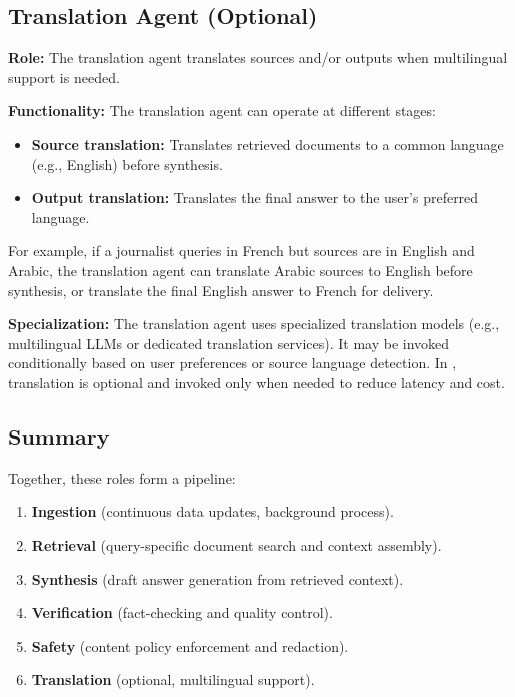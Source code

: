 \subsection{Translation Agent (Optional)}
\textbf{Role:} The translation agent translates sources and/or outputs when multilingual support is needed.  

\textbf{Functionality:} The translation agent can operate at different stages:  
\begin{itemize}
    \item \textbf{Source translation:} Translates retrieved documents to a common language (e.g., English) before synthesis.  
    \item \textbf{Output translation:} Translates the final answer to the user's preferred language.  
\end{itemize}  

For example, if a journalist queries in French but sources are in English and Arabic, the translation agent can translate Arabic sources to English before synthesis, or translate the final English answer to French for delivery.  

\textbf{Specialization:} The translation agent uses specialized translation models (e.g., multilingual LLMs or dedicated translation services). It may be invoked conditionally based on user preferences or source language detection. In \ishtar{}, translation is optional and invoked only when needed to reduce latency and cost.  

\subsection*{Summary}
Together, these roles form a pipeline:  
\begin{enumerate}
    \item \textbf{Ingestion} (continuous data updates, background process).  
    \item \textbf{Retrieval} (query-specific document search and context assembly).  
    \item \textbf{Synthesis} (draft answer generation from retrieved context).  
    \item \textbf{Verification} (fact-checking and quality control).  
    \item \textbf{Safety} (content policy enforcement and redaction).  
    \item \textbf{Translation} (optional, multilingual support).  
\end{enumerate}  

